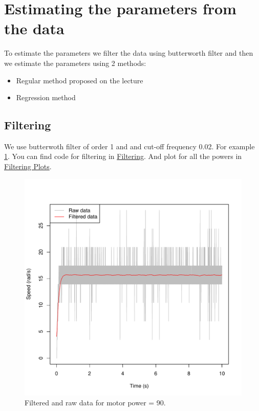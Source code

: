 \documentclass[a4paper,12pt,oneside]{article}
\begin{document}
\section {Estimating the parameters from the data}
To estimate the parameters we filter the data using butterworth filter and then we estimate the parameters using 2 methods:
\begin{itemize}
\item Regular method proposed on the lecture
\item Regression method
\end{itemize}

\subsection {Filtering}
We use butterwoth filter of order 1 and and cut-off frequency 0.02. For example \cref{fig:filtered}. You can find code for filtering in \href{https://github.com/AliaksandrSiarohin/AppliedRobotics/tree/master/identification/filtering.r}{Filtering}. And plot for all the powers in \href{https://github.com/AliaksandrSiarohin/AppliedRobotics/tree/master/motor_data/plots/filtering}{Filtering Plots}.
\begin{figure}[t]%
	\centering
	\includegraphics[width=\columnwidth]{../motor_data/plots/filtering/90}
	\caption{Filtered and raw data for motor power = 90.}%
	\label{fig:filtered}%
\end{figure}
\end{document}
